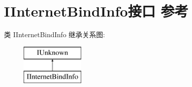 \hypertarget{interface_i_internet_bind_info}{}\section{I\+Internet\+Bind\+Info接口 参考}
\label{interface_i_internet_bind_info}
类 I\+Internet\+Bind\+Info 继承关系图\+:\begin{figure}[H]
\begin{center}
\leavevmode
\includegraphics[height=2.000000cm]{interface_i_internet_bind_info}
\end{center}
\end{figure}
